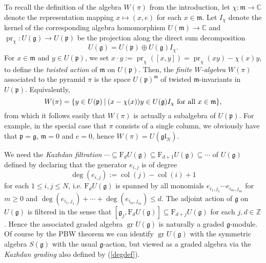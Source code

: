 \documentclass[twoside,12pt,reqno]{amsart}
\def\col{\operatorname{col}}
\def\C{{\mathbb C}}
\def\Z{{\mathbb Z}}
\def\F{\mathrm{F}}
\def\pr{{\operatorname{pr}}}
\def\gr{\operatorname{gr}}
\begin{document}
To recall the definition of the algebra $W(\pi)$ from the introduction, 
let $\chi:\mathfrak{m} \rightarrow \C$ denote
the representation mapping $x \mapsto (x,e)$ for each $x \in \mathfrak{m}$.
Let $I_\chi$ denote the kernel of the corresponding
algebra homomorphism $U(\mathfrak{m}) \rightarrow \C$
and $\pr_\chi:U(\mathfrak{g}) \rightarrow U(\mathfrak{p})$
be the projection along the direct sum decomposition
\begin{equation}
U(\mathfrak{g}) = U(\mathfrak{p}) \oplus U(\mathfrak{g}) I_\chi.
\end{equation}
For $x \in \mathfrak{m}$ and $y \in U(\mathfrak{p})$, we set
$x \cdot y := \pr_\chi([x,y]) = \pr_\chi(xy) - \chi(x)y$,
to define the {\em twisted action} 
of $\mathfrak{m}$ on $U(\mathfrak{p})$.
Then, the {\em finite $W$-algebra}
$W(\pi)$ associated to the pyramid $\pi$ is the space $U(\mathfrak{p})^{\mathfrak m}$
of twisted $\mathfrak{m}$-invariants in $U(\mathfrak{p})$.
Equivalently,
\begin{equation}
W(\pi)= \{y \in U(\mathfrak{p})\:|\:
(x - \chi(x))y \in U(\mathfrak{g})I_\chi
\hbox{ for all }x \in \mathfrak{m}\},
\end{equation}
from which it follows easily that $W(\pi)$ is actually
a subalgebra of $U(\mathfrak{p})$. 
For example, in the special case that $\pi$ consists of a single column, 
we obviously have that
$\mathfrak{p} = \mathfrak{g}$, $\mathfrak{m} = 0$
and $e = 0$, hence 
$W(\pi) = U(\mathfrak{gl}_N)$.


We need the
{\em Kazhdan filtration}
$\cdots\subseteq 
\F_d U(\mathfrak{g}) \subseteq \F_{d+1} U(\mathfrak{g}) \subseteq \cdots$
of $U(\mathfrak{g})$ defined
by declaring that the
generator $e_{i,j}$ is of degree
\begin{equation}\label{degdef}
\deg(e_{i,j}) := \col(j)-\col(i)+1
\end{equation}
for each $1 \leq i,j \leq N$, i.e. $\F_d U(\mathfrak{g})$ is
spanned by all monomials 
$e_{i_1,j_1} \cdots e_{i_m,j_m}$ for $m \geq 0$ and
$\deg(e_{i_1,j_1})+\cdots+\deg(e_{i_m,j_m}) \leq d$.
The adjoint action of $\mathfrak{g}$
on $U(\mathfrak{g})$ is filtered in the sense that
$[\mathfrak{g}_j, \F_d U(\mathfrak{g})]
\subseteq \F_{d+j} U(\mathfrak{g})$ for each $j,d \in \Z$.
Hence the associated graded algebra
$\gr U(\mathfrak{g})$ is naturally a graded
$\mathfrak{g}$-module.
Of course by the PBW theorem we can identify
$\gr U(\mathfrak{g})$ 
with the symmetric algebra $S(\mathfrak{g})$ with the usual
$\mathfrak{g}$-action, but viewed as a 
graded algebra via the {\em Kazhdan grading} also defined by (\ref{degdef}).
\end{document}
